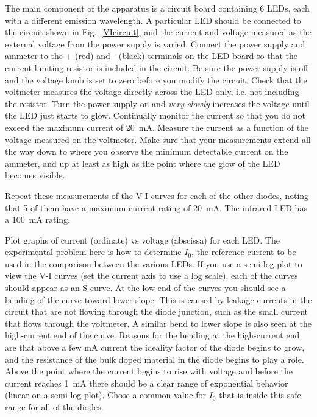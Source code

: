 \documentclass{revtex4}
\begin{document}
The main component of the apparatus is a circuit board containing 6 LEDs,
each with a different emission wavelength. A particular LED should be connected
to the circuit shown in Fig.~\ref{VIcircuit}, and the current and voltage 
measured as the external voltage from the power supply is varied. Connect
the power supply and ammeter to the + (red) and - (black) terminals on the
LED board so that the current-limiting resistor is included in the circuit.
Be sure the power supply is off and the voltage knob is set to zero before
you modify the circuit.  Check that the voltmeter measures the voltage
directly across the LED only, i.e. not including the resistor. Turn the power
supply on and {\em very slowly} increases the voltage until the LED just
starts to glow. Continually monitor the current so that you do not exceed
the maximum current of 20~mA. Measure the current as a function of the
voltage measured on the voltmeter.  Make sure that your measurements extend
all the way down to where you observe the minimum detectable current on the
ammeter, and up at least as high as the point where the glow of the LED
becomes visible.

Repeat these measurements of the V-I curves for each of the other diodes,
noting that 5 of them have a maximum current rating of 20~mA.  The infrared
LED has a 100~mA rating.

Plot graphs of current (ordinate) vs voltage (abscissa) for each LED. The
experimental problem here is how to determine $I_0$, the reference current
to be used in the comparison between the various LEDs.  If you use a semi-log
plot to view the V-I curves (set the current axis to use a log scale), each
of the curves should appear as an S-curve.  At the low end of the curves you
should see a bending of the curve toward lower slope.  This is caused by 
leakage currents in the circuit that are not flowing through the diode
junction, such as the small current that flows through the voltmeter.
A similar bend to lower slope is also seen at the high-current end of the
curve.  Reasons for the bending at the high-current end are that above a 
few mA current the ideality factor of the diode begins to grow, and the
resistance of the bulk doped material in the diode begins to play a role.
Above the point where the current begins to rise with voltage and before
the current reaches 1~mA there should be a clear range of exponential
behavior (linear on a semi-log plot).  Chose a common value for $I_0$
that is inside this safe range for all of the diodes.
\end{document}
